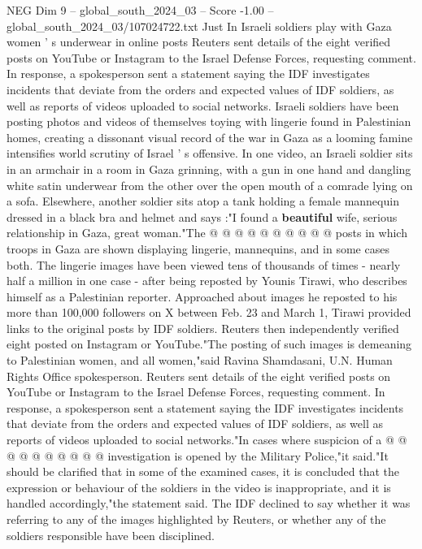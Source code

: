 \begin{textsample}{NEG Dim 9 – global\_south\_2024\_03 – Score -1.00 – global\_south\_2024\_03/107024722.txt}  \label{ex:f9_neg_410}
Just In Israeli soldiers play with Gaza women ' s underwear in online posts Reuters sent details of the eight verified posts on YouTube or Instagram to the Israel Defense Forces, requesting comment.
In response, a spokesperson sent a statement saying the IDF investigates incidents that deviate from the orders and expected values of IDF soldiers, as well as reports of videos uploaded to social networks.
Israeli soldiers have been posting photos and videos of themselves toying with lingerie found in Palestinian homes, creating a dissonant visual record of the war in Gaza as a looming famine intensifies world scrutiny of Israel ' s offensive.
In one video, an Israeli soldier sits in an armchair in a room in Gaza grinning, with a gun in one hand and dangling white satin underwear from the other over the open mouth of a comrade lying on a sofa.
Elsewhere, another soldier sits atop a tank holding a female mannequin dressed in a black bra and helmet and says :"I found a \textbf{beautiful} wife, serious relationship in Gaza, great woman."The @ @ @ @ @ @ @ @ @ @ posts in which troops in Gaza are shown displaying lingerie, mannequins, and in some cases both.
The lingerie images have been viewed tens of thousands of times - nearly half a million in one case - after being reposted by Younis Tirawi, who describes himself as a Palestinian reporter.
Approached about images he reposted to his more than 100,000 followers on X between Feb. 23 and March 1, Tirawi provided links to the original posts by IDF soldiers.
Reuters then independently verified eight posted on Instagram or YouTube."The posting of such images is demeaning to Palestinian women, and all women,"said Ravina Shamdasani, U.N.
Human Rights Office spokesperson.
Reuters sent details of the eight verified posts on YouTube or Instagram to the Israel Defense Forces, requesting comment.
In response, a spokesperson sent a statement saying the IDF investigates incidents that deviate from the orders and expected values of IDF soldiers, as well as reports of videos uploaded to social networks."In cases where suspicion of a @ @ @ @ @ @ @ @ @ @ investigation is opened by the Military Police,"it said."It should be clarified that in some of the examined cases, it is concluded that the expression or behaviour of the soldiers in the video is inappropriate, and it is handled accordingly,"the statement said.
The IDF declined to say whether it was referring to any of the images highlighted by Reuters, or whether any of the soldiers responsible have been disciplined.

\end{textsample}
